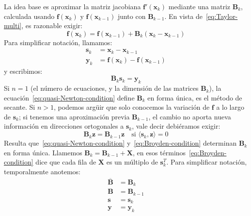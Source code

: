   La idea base
  es aproximar la matriz jacobiana \(\mathbf{f}'(\mathbf{x}_k)\)
  mediante una matriz \(\mathbf{B}_k\),
  calculada
  usando \(\mathbf{f}(\mathbf{x}_k)\) y \(\mathbf{f}(\mathbf{x}_{k - 1})\)
  junto con \(\mathbf{B}_{k - 1}\).
  En vista de~\eqref{eq:Taylor-multi},
  es razonable exigir:
  \begin{equation*}
    \mathbf{f}(\mathbf{x}_k)
      = \mathbf{f}(\mathbf{x}_{k - 1})
          + \mathbf{B}_k (\mathbf{x}_k - \mathbf{x}_{k - 1})
  \end{equation*}
  Para simplificar notación,
  llamamos:
  \begin{align*}
    \mathbf{s}_k
      &= \mathbf{x}_k - \mathbf{x}_{k - 1} \\
    \mathbf{y}_k
      &= \mathbf{f}(\mathbf{x}_k) - \mathbf{f}(\mathbf{x}_{k - 1})
  \end{align*}
  y escribimos:
  \begin{equation}
    \label{eq:quasi-Newton-condition}
    \mathbf{B}_k \mathbf{s}_k
      = \mathbf{y}_k
  \end{equation}
  Si \(n = 1\)
  (el número de ecuaciones,
   y la dimensión de las matrices \(\mathbf{B}_k\)),
  la ecuación~\eqref{eq:quasi-Newton-condition}
  define \(\mathbf{B}_k\) en forma única,
  es el método de secante.
  Si \(n > 1\),
  podemos argüir que solo conocemos la variación de \(\mathbf{f}\)
  a lo largo de \(\mathbf{s}_k\);
  si tenemos una aproximación previa \(\mathbf{B}_{k - 1}\),
  el cambio no aporta nueva información
  en direcciones ortogonales a \(\mathbf{s}_k\),
  vale decir debiéramos exigir:
  \begin{equation}
    \label{eq:Broyden-condition}
    \mathbf{B}_k \mathbf{z}
      = \mathbf{B}_{k - 1} \mathbf{z}
      \quad\text{si \(\langle \mathbf{s}_k, \mathbf{z} \rangle = 0\)}
  \end{equation}
  Resulta que~\eqref{eq:quasi-Newton-condition} y~\eqref{eq:Broyden-condition}
  determinan \(\mathbf{B}_k\) en forma única.
  Llamemos \(\mathbf{B}_k = \mathbf{B}_{k - 1} + \mathbf{X}\),
  en esos términos~\eqref{eq:Broyden-condition}
  dice que cada fila de \(\mathbf{X}\) es un múltiplo de \(\mathbf{s}_k^T\).
  Para simplificar notación,
  temporalmente anotemos:
  \begin{align*}
    \overline{\mathbf{B}}
      &= \mathbf{B}_k \\
    \mathbf{B}
      &= \mathbf{B}_{k - 1} \\
    \mathbf{s}
      &= \mathbf{s}_k \\
    \mathbf{y}
      &= \mathbf{y}_k
  \end{align*}
